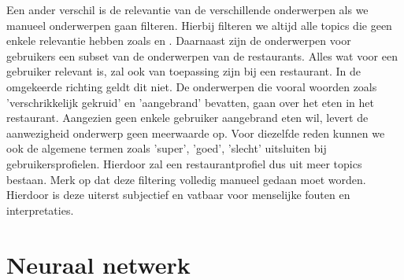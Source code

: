 Een ander verschil is de relevantie van de verschillende onderwerpen als we manueel onderwerpen gaan filteren. Hierbij filteren we altijd alle topics die geen enkele relevantie hebben zoals  en . Daarnaast zijn de onderwerpen voor gebruikers een subset van de onderwerpen van de restaurants. Alles wat voor een gebruiker relevant is, zal ook van toepassing zijn bij een restaurant. In de omgekeerde richting geldt dit niet. De onderwerpen die vooral woorden zoals 'verschrikkelijk gekruid' en 'aangebrand' bevatten, gaan over het eten in het restaurant. Aangezien geen enkele gebruiker aangebrand eten wil, levert de aanwezigheid onderwerp geen meerwaarde op. Voor diezelfde reden kunnen we ook de algemene termen zoals 'super', 'goed', 'slecht' uitsluiten bij gebruikersprofielen. Hierdoor zal een restaurantprofiel dus uit meer topics bestaan. Merk op dat deze filtering volledig manueel gedaan moet worden. Hierdoor is deze uiterst subjectief en vatbaar voor menselijke fouten en interpretaties.

























































\section{Neuraal netwerk}
\label{sec:chapt4_neuraal_netwerk}

